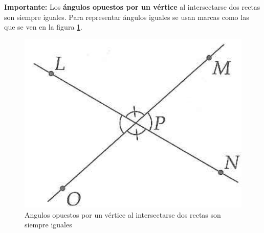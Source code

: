 \textbf{Importante: }Los \textbf{ángulos opuestos por un vértice} al intersectarse dos rectas son siempre iguales. Para representar ángulos iguales se usan marcas como las que se ven en la figura \ref{angulos_opuestos_iguales}.

\begin{figure}[H]
	\centering
	\includegraphics[width=0.5\linewidth]{Geometria/imgs/angulos_opuestos_iguales}
	\caption{Angulos opuestos por un vértice al intersectarse dos rectas son siempre iguales}
	\label{angulos_opuestos_iguales}
\end{figure}

